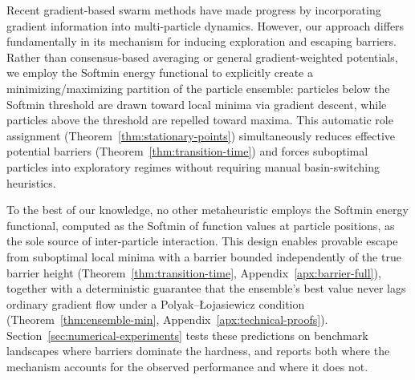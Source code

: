 \documentclass{opt2026} %
\begin{document}
Recent gradient-based swarm methods \citep{riedl2023gradient, bolte2024swarm, carrillo2021consensus, noel2012new} have made progress by incorporating gradient information into multi-particle dynamics. However, our approach differs fundamentally in its mechanism for inducing exploration and escaping barriers. Rather than consensus-based averaging or general gradient-weighted potentials, we employ the Softmin energy functional to explicitly create a minimizing/maximizing partition of the particle ensemble: particles below the Softmin threshold are drawn toward local minima via gradient descent, while particles above the threshold are repelled toward maxima. This automatic role assignment (Theorem~\ref{thm:stationary-points}) simultaneously reduces effective potential barriers (Theorem~\ref{thm:transition-time}) and forces suboptimal particles into exploratory regimes without requiring manual basin-switching heuristics.

To the best of our knowledge, no other metaheuristic employs the Softmin energy functional, computed as the Softmin of function values at particle positions, as the sole source of inter-particle interaction. This design enables provable escape from suboptimal local minima with a barrier bounded independently of the true barrier height (Theorem~\ref{thm:transition-time}, Appendix~\ref{apx:barrier-full}), together with a deterministic guarantee that the ensemble's best value never lags ordinary gradient flow under a Polyak--\L{}ojasiewicz condition (Theorem~\ref{thm:ensemble-min}, Appendix~\ref{apx:technical-proofs}). Section~\ref{sec:numerical-experiments} tests these predictions on benchmark landscapes where barriers dominate the hardness, and reports both where the mechanism accounts for the observed performance and where it does not.
\end{document}
